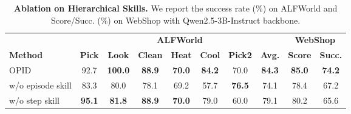 \begin{table}[ht!]
\centering
\caption{
    \textbf{Ablation on Hierarchical Skills.}
    We report the success rate (\%) on ALFWorld and Score/Succ. (\%) on WebShop with Qwen2.5-3B-Instruct backbone.
}
\vspace{0.05in}
\label{tab:ablation_hierarchical_skills}
\small
\setlength{\tabcolsep}{5.5pt}
\renewcommand{\arraystretch}{1.08}
\begin{tabular}{lccccccccc}
\toprule
& \multicolumn{7}{c}{\textbf{ALFWorld}}
& \multicolumn{2}{c}{\textbf{WebShop}} \\
\cmidrule(lr){2-8} \cmidrule(lr){9-10}
\textbf{Method}
& \textbf{Pick} & \textbf{Look} & \textbf{Clean} & \textbf{Heat} & \textbf{Cool} & \textbf{Pick2} & \textbf{Avg.}
& \textbf{Score} & \textbf{Succ.} \\
\midrule
\rowcolor{gray!10}
OPID
    & 92.7 & \textbf{100.0} & \textbf{88.9} & \textbf{70.0} & \textbf{84.2} & 70.0 & \textbf{84.3}
    & \textbf{85.0} & \textbf{74.2}
    \\
\midrule
\;\;\;w/o episode skill
    & 83.3 & 80.0 & 78.1 & 69.2 & 57.7 & \textbf{76.5} & 74.1
    & 78.4 & 67.2
    \\
\;\;\;w/o step skill
    & \textbf{95.1} & \textbf{81.8} & \textbf{88.9} & \textbf{70.0} & 79.0 & 60.0 & 79.1
    & 80.2 & 65.6
    \\
\bottomrule
\end{tabular}
\end{table}
